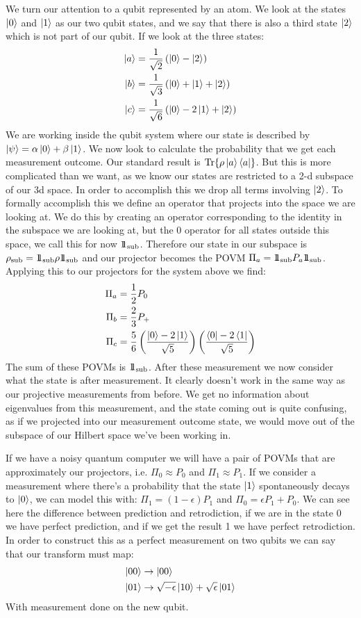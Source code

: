 We turn our attention to a qubit represented by an atom. We look at the states $\ket{0}$ and $\ket{1}$ as our two qubit states, and we say that there is also a third state $\ket{2}$ which is not part of our qubit. If we look at the three states:
\begin{align*}
	\ket{a} &= \frac{1}{\sqrt{2}} \left(\ket{0} - \ket{2}\right) \\
	\ket{b} &= \frac{1}{\sqrt{3}} \left(\ket{0} + \ket{1} + \ket{2}\right) \\
	\ket{c} &= \frac{1}{\sqrt{6}} \left( \ket{0} - 2\ket{1} + \ket{2}\right)
\end{align*}
We are working inside the qubit system where our state is described by $\ket{\psi} = \alpha\ket{0} + \beta \ket{1}$. We now look to calculate the probability that we get each measurement outcome.
Our standard result is $\Tr{\rho \ket{a}\bra{a}}$. But this is more complicated than we want, as we know our states are restricted to a 2-d subspace of our 3d space. 
In order to accomplish this we drop all terms involving $\ket{2}$. To formally accomplish this we define an operator that projects into the space we are looking at.
We do this by creating an operator corresponding to the identity in the subspace we are looking at, but the 0 operator for all states outside this space, we call this for now $1\!\!1_\text{sub}$.
Therefore our state in our subspace is $\rho_\text{sub} = 1\!\!1_\text{sub} \rho1\!\!1_\text{sub}$ and our projector becomes the POVM $\Pi_a = 1\!\!1_\text{sub}P_a1\!\!1_\text{sub}$.
Applying this to our projectors for the system above we find:
\begin{align*}
	\Pi_a &= \frac{1}{2} P_0 \\
	\Pi_b &= \frac{2}{3} P_+ \\
	\Pi_c &= \frac{5}{6} \left(\frac{\ket{0} - 2\ket{1}}{\sqrt{5}}\right)\left(\frac{\bra{0} - 2\bra{1}}{\sqrt{5}}\right)
\end{align*}
The sum of these POVMs is $1\!\!1_\text{sub}$. After these measurement we now consider what the state is after measurement. It clearly doesn't work in the same way as our projective measurements from before.
We get no information about eigenvalues from this measurement, and the state coming out is quite confusing, as if we projected into our measurement outcome state, we would move out of the subspace of our Hilbert space we've been working in.

If we have a noisy quantum computer we will have a pair of POVMs that are approximately our projectors, i.e. $\Pi_0 \approx P_0$ and $\Pi_1 \approx P_1$. 
If we consider a measurement where there's a probability that the state $\ket{1}$ spontaneously decays to $\ket{0}$, we can model this with: $\Pi_1 = (1-\epsilon)P_1$ and $\Pi_0 = \epsilon P_1 + P_0$.
We can see here the difference between prediction and retrodiction, if we are in the state 0 we have perfect prediction, and if we get the result 1 we have perfect retrodiction.
In order to construct this as a perfect measurement on two qubits we can say that our transform must map:
\begin{align*}
	\ket{00} &\to \ket{00} \\
	\ket{01} &\to \sqrt{-\epsilon}\ket{10} + \sqrt{\epsilon}\ket{01}
\end{align*}
With measurement done on the new qubit.
